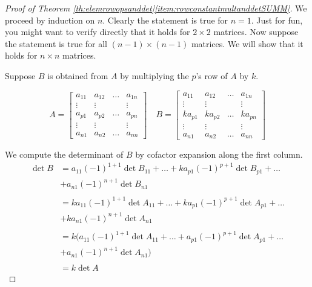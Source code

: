 \documentclass{ximera}
\begin{document}
\begin{proof}[Proof of Theorem \ref{th:elemrowopsanddet}\ref{item:rowconstantmultanddetSUMM}]
We proceed by induction on $n$.  Clearly the statement is true for $n=1$.  Just for fun, you might want to verify directly that it holds for $2\times 2$ matrices.  Now suppose the statement is true for all $(n-1)\times (n-1)$ matrices. We will show that it holds for $n\times n$ matrices.

Suppose $B$ is obtained from $A$ by multiplying the $p$'s row of $A$ by $k$.  

$$A=\begin{bmatrix} a_{11} & a_{12} & \dots  & a_{1n}  \\
   \vdots & \vdots &  & \vdots \\
   a_{p1} & a_{p2} &\dots  & a_{pn}  \\
   \vdots & \vdots &  & \vdots  \\
   a_{n1} & a_{n2} & \dots  & a_{nn}\end{bmatrix}\quad
   B=\begin{bmatrix} a_{11} & a_{12} & \dots  & a_{1n}  \\
   \vdots & \vdots &  & \vdots \\
   ka_{p1} & ka_{p2} &\dots  & ka_{pn}  \\
   \vdots & \vdots &  & \vdots  \\
   a_{n1} & a_{n2} & \dots  & a_{nn}\end{bmatrix}$$
   
   We compute the determinant of $B$ by cofactor expansion along the first column.
   \begin{align*}
   \det B &=a_{11}(-1)^{1+1}\det B_{11}+\ldots +ka_{p1}(-1)^{p+1}\det B_{p1}+\ldots \\
   &+ a_{n1}(-1)^{n+1}\det B_{n1}\\
   \\
   &=ka_{11}(-1)^{1+1}\det A_{11}+\ldots +ka_{p1}(-1)^{p+1}\det A_{p1}+\ldots \\
   &+ ka_{n1}(-1)^{n+1}\det A_{n1}\\
   \\
   &=k\Big(a_{11}(-1)^{1+1}\det A_{11}+\ldots +a_{p1}(-1)^{p+1}\det A_{p1}+\ldots \\
   &+ a_{n1}(-1)^{n+1}\det A_{n1}\Big)\\
   \\
   &=k\det A
   \end{align*}
\end{proof}
\end{document}
